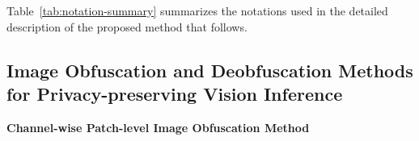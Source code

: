 \documentclass{ieeeaccess}
\begin{document}



Table~\ref{tab:notation-summary} summarizes the notations used in the detailed description of the proposed method that follows.


\subsection{Image Obfuscation and Deobfuscation Methods for Privacy-preserving Vision Inference}
\noindent\textbf{Channel-wise Patch-level Image Obfuscation Method} \label{sec:pro:patch}
\end{document}
